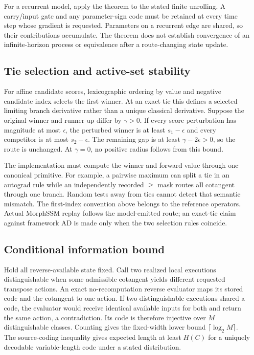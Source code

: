 For a recurrent model, apply the theorem to the stated finite unrolling.  A
carry/input gate and any parameter-sign code must be retained at every time
step whose gradient is requested.  Parameters on a recurrent edge are shared,
so their contributions accumulate.  The theorem does not establish convergence
of an infinite-horizon process or equivalence after a route-changing state
update.

\subsection{Tie selection and active-set stability}

For affine candidate scores, lexicographic ordering by value and negative
candidate index selects the first winner.  At an exact tie this defines a
selected limiting branch derivative rather than a unique classical derivative.
Suppose the original winner and runner-up differ by $\gamma>0$.  If every score
perturbation has magnitude at most $\epsilon$, the perturbed winner is at least
$s_1-\epsilon$ and every competitor is at most $s_2+\epsilon$.  The remaining
gap is at least $\gamma-2\epsilon>0$, so the route is unchanged.  At
$\gamma=0$, no positive radius follows from this bound.

The implementation must compute the winner and forward value through one
canonical primitive.  For example, a pairwise maximum can split a tie in an
autograd rule while an independently recorded $\geq$ mask routes all cotangent
through one branch.  Random tests away from ties cannot detect that semantic
mismatch.  The first-index convention above belongs to the reference
operators.  Actual MorphSSM replay follows the model-emitted route; an exact-tie
claim against framework AD is made only when the two selection rules coincide.

\subsection{Conditional information bound}

Hold all reverse-available state fixed.  Call two realized local executions
distinguishable when some admissible cotangent yields different requested
transpose actions.  An exact no-recomputation reverse evaluator maps its stored
code and the cotangent to one action.  If two distinguishable executions shared
a code, the evaluator would receive identical available inputs for both and
return the same action, a contradiction.  Its code is therefore injective over
$M$ distinguishable classes.  Counting gives the fixed-width lower bound
$\lceil\log_2 M\rceil$.  The source-coding inequality gives expected length at
least $H(C)$ for a uniquely decodable variable-length code under a stated
distribution.

